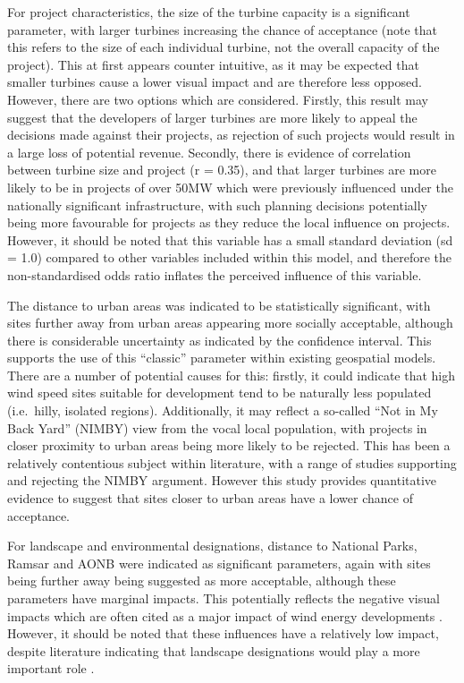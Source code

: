 \documentclass[a4paper,]{article}
\theoremstyle{definition}
\theoremstyle{definition}
\theoremstyle{definition}
\theoremstyle{remark}
\begin{document}
For project characteristics, the size of the turbine capacity is a significant parameter, with larger turbines increasing the chance of acceptance (note that this refers to the size of each individual turbine, not the overall capacity of the project). This at first appears counter intuitive, as it may be expected that smaller turbines cause a lower visual impact and are therefore less opposed. However, there are two options which are considered. Firstly, this result may suggest that the developers of larger turbines are more likely to appeal the decisions made against their projects, as rejection of such projects would result in a large loss of potential revenue. Secondly, there is evidence of correlation between turbine size and project (r = 0.35), and that larger turbines are more likely to be in projects of over 50MW which were previously influenced under the nationally significant infrastructure, with such planning decisions potentially being more favourable for projects as they reduce the local influence on projects. However, it should be noted that this variable has a small standard deviation (sd = 1.0) compared to other variables included within this model, and therefore the non-standardised odds ratio inflates the perceived influence of this variable.

The distance to urban areas was indicated to be statistically significant, with sites further away from urban areas appearing more socially acceptable, although there is considerable uncertainty as indicated by the confidence interval. This supports the use of this ``classic'' parameter within existing geospatial models. There are a number of potential causes for this: firstly, it could indicate that high wind speed sites suitable for development tend to be naturally less populated (i.e.~hilly, isolated regions). Additionally, it may reflect a so-called ``Not in My Back Yard'' (NIMBY) view from the vocal local population, with projects in closer proximity to urban areas being more likely to be rejected. This has been a relatively contentious subject within literature, with a range of studies supporting \citep{Haggett2006, Jones2010} and rejecting \citep{VanRensburg20, Devine-Wright2005a, Populus2005} the NIMBY argument. However this study provides quantitative evidence to suggest that sites closer to urban areas have a lower chance of acceptance.

For landscape and environmental designations, distance to National Parks, Ramsar and AONB were indicated as significant parameters, again with sites being further away being suggested as more acceptable, although these parameters have marginal impacts. This potentially reflects the negative visual impacts which are often cited as a major impact of wind energy developments \citep{Langer2016, Jones2010}. However, it should be noted that these influences have a relatively low impact, despite literature indicating that landscape designations would play a more important role \citep{Langer2016}.
\end{document}

